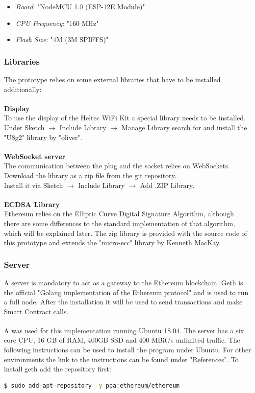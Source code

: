 \begin{itemize}
    \item \textit{Board}: "NodeMCU 1.0 (ESP-12E Module)"
    \item \textit{CPU Frequency}: "160 MHz"
    \item \textit{Flash Size}: "4M (3M SPIFFS)"
\end{itemize}
\leavevmode

\subsubsection{Libraries}
The prototype relies on some external libraries that have to be installed additionally:
\\\\
\textbf{Display}\\
To use the display of the Heltec WiFi Kit a special library needs to be installed. Under Sketch $\rightarrow$ Include Library $\rightarrow$ Manage Library search for and install the "U8g2" library by "oliver".
\\\\
\textbf{WebSocket server}\\
The communication between the plug and the socket relies on WebSockets. Download the library as a zip file from the git repository\cite{websockets}.
\\
Install it via Sketch $\rightarrow$ Include Library $\rightarrow$ Add .ZIP Library.
\\\\
\textbf{ECDSA Library}\\
Ethereum relies on the Elliptic Curve Digital Signature Algorithm, although there are some differences to the standard implementation of that algorithm, which will be explained later. The zip library is provided with the source code of this prototype and extends the "micro-ecc" library by Kenneth MacKay\cite{micro-ecc}.
\\

\subsubsection{Server}
A server is mandatory to act as a gateway to the Ethereum blockchain. Geth is the official "Golang implementation of the Ethereum protocol"\cite{geth} and is used to run a full node. After the installation it will be used to send transactions and make Smart Contract calls.
\\\\
A  was used for this implementation running Ubuntu 18.04. The server has a six core CPU, 16 GB of RAM, 400GB SSD and 400 MBit/s unlimited traffic. The following instructions can be used to install the program under Ubuntu. For other environments the link to the instructions can be found under "References"\cite{geth-instructions}.
\newpage
To install geth add the repository first:
\begin{lstlisting}[language=bash]
  $ sudo add-apt-repository -y ppa:ethereum/ethereum
\end{lstlisting}

